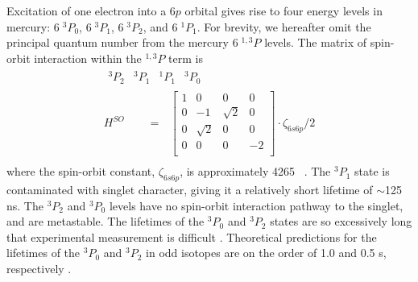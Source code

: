 \documentclass[12pt]{mitthesis}
\begin{document}
Excitation of one electron into a $6p$ orbital gives rise to four
energy levels in mercury: $6 \; ^3P_0$, $6 \; ^3P_1$, $6 \; ^3P_2$,
and $6 \; ^1P_1$.  For brevity, we hereafter omit the principal
quantum number from the mercury $6 \; ^{1,3}P$ levels.  The matrix of
spin-orbit interaction within the $^{1,3}P$ term is
\begin{equation}
\begin{split}
 \begin{array}{cccc}^3P_2 & ^3P_1 & ^1P_1 & ^3P_0\end{array}
 \:\:\:\:\:\:\:\:\:\:\:\:\:\:\:\\
H^{SO} \:\:\:\:\:\:\:\:\: = \:\:\:
    \begin{bmatrix}
     1 & 0 & 0 & 0  \\
     0 & -1 & \sqrt{2} & 0 \\   
     0 & \sqrt{2} & 0 & 0 \\ 
     0 & 0 & 0 & -2 \\  
    \end{bmatrix}
  \cdot \zeta_{6s6p}/2\\
\end{split}
\end{equation}
where the spin-orbit constant, $\zeta_{6s6p}$, is approximately 4265
\rcm\ \cite{field04}.  The $^3P_1$ state is contaminated with singlet
character, giving it a relatively short lifetime of $\sim$125 ns.  The
$^3P_2$ and $^3P_0$ levels have no spin-orbit interaction pathway to
the singlet, and are metastable.  The lifetimes of the $^3P_0$ and
$^3P_2$ states are so excessively long that experimental measurement
is difficult \cite{wexler80}.  Theoretical predictions for the
lifetimes of the $^3P_0$ and $^3P_2$ in odd isotopes are on the order
of 1.0 and 0.5 s, respectively \cite{mishra01}.
\end{document}
